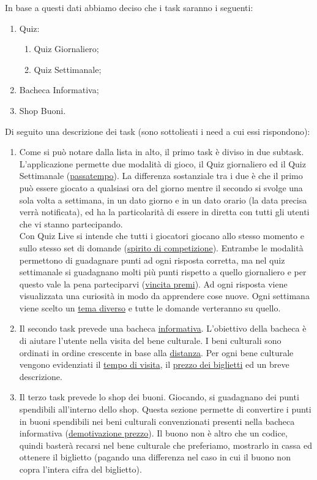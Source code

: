 \documentclass{article}
\begin{document}
In base a questi dati abbiamo deciso che i task saranno i seguenti:
\begin{enumerate}
\item Quiz:
	\begin{enumerate}
	\item Quiz Giornaliero;
	\item Quiz Settimanale;
	\end{enumerate}
\item Bacheca Informativa;
\item Shop Buoni.
\end{enumerate}
Di seguito una descrizione dei task (sono sottolieati i need a cui essi rispondono):
\begin{enumerate}
\item Come si può notare dalla lista in alto, il primo task è diviso in due subtask. L’applicazione permette due modalità di gioco, il Quiz giornaliero ed il Quiz Settimanale (\underline{passatempo}). La differenza sostanziale tra i due è che il primo può essere giocato a qualsiasi ora del giorno mentre il secondo si svolge una sola volta a settimana, in un dato giorno e in un dato orario (la data precisa verrà notificata), ed ha la particolarità di essere in diretta con tutti gli utenti che vi stanno partecipando.\\Con Quiz Live si intende che tutti i giocatori giocano allo stesso momento e sullo stesso set di domande (\underline{spirito di competizione}). Entrambe le modalità permettono di guadagnare punti ad ogni risposta corretta, ma nel quiz settimanale si guadagnano molti più punti rispetto a quello giornaliero e per questo vale la pena parteciparvi (\underline{vincita premi}). Ad ogni risposta viene visualizzata una curiosità in modo da apprendere cose nuove. Ogni settimana viene scelto un \underline{tema diverso} e tutte le domande verteranno su quello.
\item Il secondo task prevede una bacheca \underline{informativa}. L’obiettivo della bacheca è di aiutare l’utente nella visita del bene culturale. I beni culturali sono ordinati in ordine crescente in base alla \underline{distanza}. Per ogni bene culturale vengono evidenziati il \underline{tempo di visita}, il \underline{prezzo dei biglietti} ed un breve descrizione.
\item Il terzo task prevede lo shop dei buoni. Giocando, si guadagnano dei punti spendibili all’interno dello shop. Questa sezione permette di convertire i punti in buoni spendibili nei beni culturali convenzionati presenti nella bacheca informativa (\underline{demotivazione prezzo}). Il buono non è altro che un codice, quindi basterà recarsi nel bene culturale che preferiamo, mostrarlo in cassa ed ottenere il biglietto (pagando una differenza nel caso in cui il buono non copra l’intera cifra del biglietto).
\end{enumerate}
   
\end{document}
